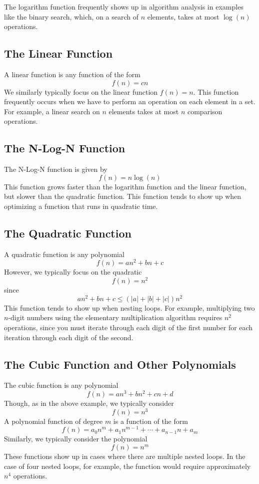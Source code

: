 \documentclass[a4paper]{article}
\begin{document}
  The logarithm function frequently shows up in algorithm analysis in examples like the binary search, which, on a search of $n$ elements, takes at most $\log(n)$ operations.

 \subsection{The Linear Function}

  A linear function is any function of the form \[f(n)=cn\] We similarly typically focus on the linear function $f(n)=n$. This function frequently occurs when we have to perform an operation on each element in a set. For example, a linear search on $n$ elements takes at most $n$ comparison operations.

\subsection{The N-Log-N Function}

  The N-Log-N function is given by \[f(n)=n\log(n)\] This function grows faster than the logarithm function and the linear function, but slower than the quadratic function. This function tends to show up when optimizing a function that runs in quadratic time.
 
 \subsection{The Quadratic Function}

  A quadratic function is any polynomial \[f(n) = an^2+bn+c\] However, we typically focus on the quadratic \[f(n) = n^2\] since \[an^2+bn+c\leq\left(|a|+|b|+|c|\right)n^2\] This function tends to show up when nesting loops. For example, multiplying two $n$-digit numbers using the elementary multiplication algorithm requires $n^2$ operations, since you must iterate through each digit of the first number for each iteration through each digit of the second.

 \subsection{The Cubic Function and Other Polynomials}

  The cubic function is any polynomial \[f(n)=an^3+bn^2+cn+d\] Though, as in the above example, we typically consider \[f(n) = n^3\] A polynomial function of degree $m$ is a function of the form \[f(n)=a_0n^m+a_1n^{m-1}+\cdots+a_{n-1}n+a_m\] Similarly, we typically consider the polynomial \[f(n)=n^m\] These functions show up in cases where there are multiple nested loops. In the case of four nested loops, for example, the function would require approximately $n^4$ operations.
\end{document}
